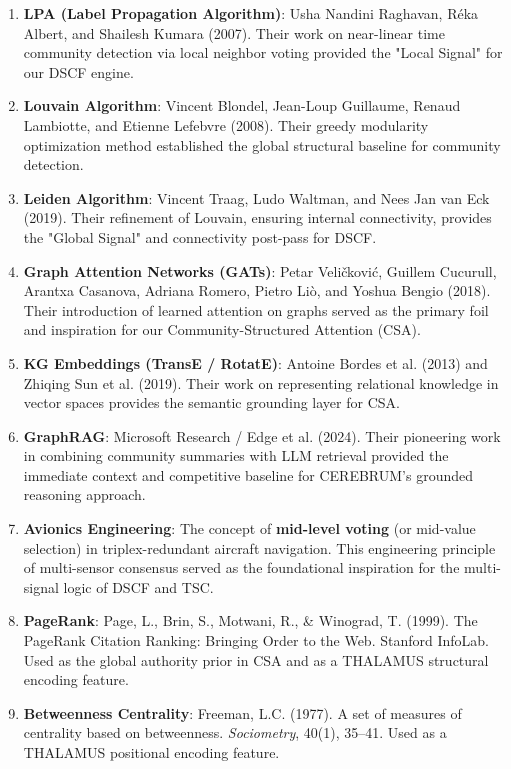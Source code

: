 \documentclass[10pt,journal,compsoc]{IEEEtran}
\begin{document}
\begin{enumerate}
\item \textbf{LPA (Label Propagation Algorithm)}: Usha Nandini Raghavan, Réka Albert, and Shailesh Kumara (2007). Their work on near-linear time community detection via local neighbor voting provided the "Local Signal" for our DSCF engine.
\item \textbf{Louvain Algorithm}: Vincent Blondel, Jean-Loup Guillaume, Renaud Lambiotte, and Etienne Lefebvre (2008). Their greedy modularity optim\-ization method established the global structural baseline for community detection.
\item \textbf{Leiden Algorithm}: Vincent Traag, Ludo Waltman, and Nees Jan van Eck (2019). Their refinement of Louvain, ensuring internal conne\-ctivity, provides the "Global Signal" and conne\-ctivity post-pass for DSCF.
\item \textbf{Graph Attention Networks (GATs)}: Petar Veličković, Guillem Cucurull, Arantxa Casanova, Adriana Romero, Pietro Liò, and Yoshua Bengio (2018). Their intro\-duction of learned attention on graphs served as the primary foil and inspiration for our Community-Structured Attention (CSA).
\item \textbf{KG Embeddings (TransE / RotatE)}: Antoine Bordes et al. (2013) and Zhiqing Sun et al. (2019). Their work on repre\-senting relational knowledge in vector spaces provides the semantic grounding layer for CSA.
\item \textbf{GraphRAG}: Microsoft Research / Edge et al. (2024). Their pioneering work in combining community summaries with LLM retrieval provided the immediate context and competitive baseline for CEREBRUM's grounded reasoning approach.
\item \textbf{Avionics Engineering}: The concept of \textbf{mid-level voting} (or mid-value selection) in triplex-redundant aircraft navigation. This engineering principle of multi-sensor consensus served as the found\-ational inspiration for the multi-signal logic of DSCF and TSC.
\item \textbf{PageRank}: Page, L., Brin, S., Motwani, R., \& Winograd, T. (1999). The PageRank Citation Ranking: Bringing Order to the Web. Stanford InfoLab. Used as the global authority prior in CSA and as a THALAMUS structural encoding feature.
\item \textbf{Betweenness Centrality}: Freeman, L.C. (1977). A set of measures of centrality based on betweenness. \textit{Sociometry}, 40(1), 35–41. Used as a THALAMUS positional encoding feature.

\end{enumerate}
\end{document}
